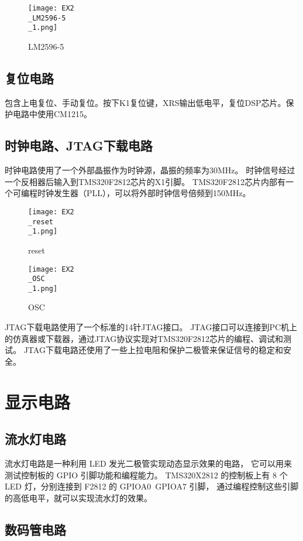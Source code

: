 \documentclass{math201}
\begin{document}
\begin{figure}[H]  
  \centering\texttt{[image: EX2\\\_LM2596-5\\\_1.png]}  
  \caption{LM2596-5}     
\end{figure}

\subsection{复位电路}

包含上电复位、手动复位。按下K1复位键，XRS输出低电平，复位DSP芯片。保护电路中使用CM1215。

\subsection{时钟电路、JTAG下载电路}

时钟电路使用了一个外部晶振作为时钟源，晶振的频率为30MHz。
时钟信号经过一个反相器后输入到TMS320F2812芯片的X1引脚。
TMS320F2812芯片内部有一个可编程时钟发生器（PLL），可以将外部时钟信号倍频到150MHz。

\begin{figure}[H]  
  \centering\texttt{[image: EX2\\\_reset\\\_1.png]}  
  \caption{reset}     
\end{figure}

\begin{figure}[H]  
  \centering\texttt{[image: EX2\\\_OSC\\\_1.png]}  
  \caption{OSC}     
\end{figure}

JTAG下载电路使用了一个标准的14针JTAG接口。
JTAG接口可以连接到PC机上的仿真器或下载器，通过JTAG协议实现对TMS320F2812芯片的编程、调试和测试。
JTAG下载电路还使用了一些上拉电阻和保护二极管来保证信号的稳定和安全。

\section{显示电路}

\subsection{流水灯电路}

流水灯电路是一种利用 LED 发光二极管实现动态显示效果的电路，
它可以用来测试控制板的 GPIO 引脚功能和编程能力。
TMS320X2812 的控制板上有 8 个 LED 灯，分别连接到 F2812 的 GPIOA0~GPIOA7 引脚，
通过编程控制这些引脚的高低电平，就可以实现流水灯的效果。

\subsection{数码管电路}
\end{document}
